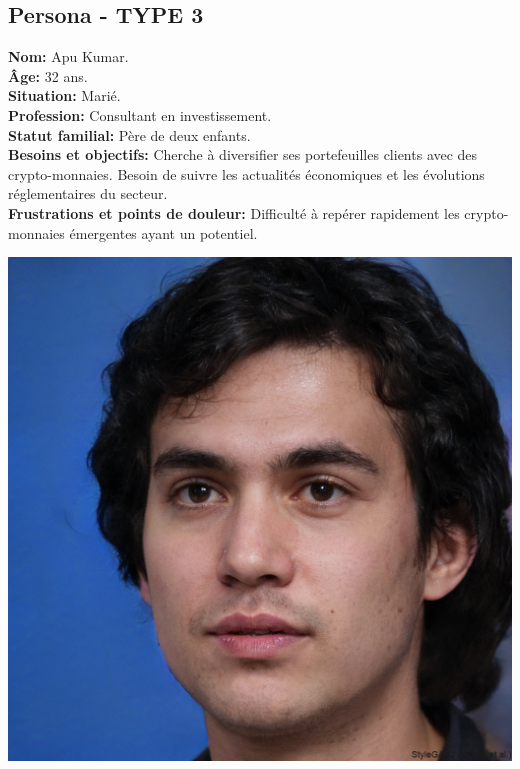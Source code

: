 \documentclass[a4paper,11pt]{article}
\begin{document}
\subsection{Persona - TYPE 3}
\begin{minipage}{0.6\textwidth} %
\textbf{Nom:} Apu Kumar.\\
\textbf{Âge:} 32 ans.\\
\textbf{Situation:} Marié.\\
\textbf{Profession:} Consultant en investissement.\\
\textbf{Statut familial:} Père de deux enfants.\\
\textbf{Besoins et objectifs:} Cherche à diversifier ses portefeuilles clients avec des crypto-monnaies. Besoin de suivre les actualités économiques et les évolutions réglementaires du secteur.\\
\textbf{Frustrations et points de douleur:} Difficulté à repérer rapidement les crypto-monnaies émergentes ayant un potentiel.\\
\end{minipage}%
\hspace{1cm}
\begin{minipage}{0.3\textwidth} %
    \begin{center}
        \includegraphics[width=\textwidth]{images/crypto-expert.jpeg} %
    \end{center}
\end{minipage}
\end{document}
